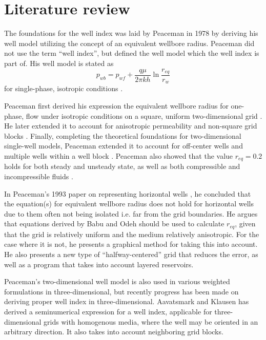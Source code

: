 
\section{Literature review} %
\label{sec:literature_review}
The foundations for the well index was laid by Peaceman in 1978 \cite{Aavatsmark2003Well} by deriving his well model utilizing the concept of an equivalent wellbore radius. Peaceman did not use the term ``well index'', but defined the well model which the well index is part of. His well model is stated as
\begin{equation}
    \label{eq:review-model}
    p_{wb} = p_{wf} + \frac{q\mu}{2\pi kh} \ln \frac{r_{eq}}{r_w}
\end{equation}
for single-phase, isotropic conditions \cite{Peaceman1978Interpretation}.

Peaceman first derived his expression the equivalent wellbore radius for one-phase, flow under isotropic conditions on a square, uniform two-dimensional grid \cite{Peaceman1978Interpretation}. He later extended it to account for anisotropic permeability and non-square grid blocks \cite{Peaceman1983Interpretation}. Finally, completing the theoretical foundations for two-dimensional single-well models, Peaceman extended it to account for off-center wells and multiple wells within a well block \cite{Peaceman1990Interpretation}. Peaceman also showed that the value $r_{eq}=0.2$ holds for both steady and unsteady state, as well as both compressible and incompressible fluids \cite{Peaceman1978Interpretation}.

In Peaceman's 1993 paper on representing horizontal wells \cite{Peaceman1993Representation}, he concluded that the equation(s) for equivalent wellbore radius does not hold for horizontal wells due to them often not being isolated i.e. far from the grid boundaries. He argues that equations derived by Babu and Odeh \cite{Babu1991Relation} should be used to calculate $r_{eq}$, given that the grid is relatively uniform and the medium relatively anisotropic. For the case where it is not, he presents a graphical method for taking this into account. He also presents a new type of ``halfway-centered'' grid that reduces the error, as well as a program that takes into account layered reservoirs.

Peaceman's two-dimensional well model is also used in various weighted formulations in three-dimensional, but recently progress has been made on deriving proper well index in three-dimensional. Aavatsmark and Klausen \cite{Aavatsmark2003Well} has derived a seminumerical expression for a well index, applicable for three-dimensional grids with homogenous media, where the well may be oriented in an arbitrary direction. It also takes into account neighboring grid blocks.

